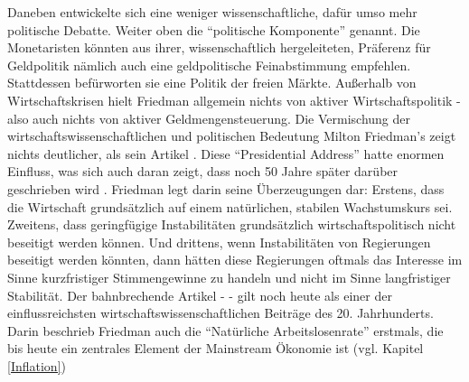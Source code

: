 Daneben entwickelte sich eine weniger wissenschaftliche, dafür umso mehr politische Debatte. Weiter oben die "`politische Komponente"' genannt. Die Monetaristen könnten aus ihrer, wissenschaftlich hergeleiteten, Präferenz für Geldpolitik nämlich auch eine geldpolitische Feinabstimmung empfehlen. Stattdessen befürworten sie eine Politik der freien Märkte. Außerhalb von Wirtschaftskrisen hielt Friedman allgemein nichts von aktiver Wirtschaftspolitik - also auch nichts von aktiver Geldmengensteuerung. Die Vermischung der wirtschaftswissenschaftlichen und politischen Bedeutung Milton Friedman's zeigt nichts deutlicher, als sein Artikel \textcite{Friedman1968}. Diese "`Presidential Address"' hatte enormen Einfluss, was sich auch daran zeigt, dass noch 50 Jahre später darüber geschrieben wird \parencite{Mankiw2018}. Friedman legt darin seine Überzeugungen dar: Erstens, dass die Wirtschaft grundsätzlich auf einem natürlichen, stabilen Wachstumskurs sei. Zweitens, dass geringfügige Instabilitäten grundsätzlich wirtschaftspolitisch nicht beseitigt werden können. Und drittens, wenn Instabilitäten von Regierungen beseitigt werden könnten, dann hätten diese Regierungen oftmals das Interesse im Sinne kurzfristiger Stimmengewinne zu handeln und nicht im Sinne langfristiger Stabilität. Der bahnbrechende Artikel - \textcite{Friedman1968} - gilt noch heute als einer der einflussreichsten wirtschaftswissenschaftlichen Beiträge des 20. Jahrhunderts. Darin beschrieb Friedman auch die "`Natürliche Arbeitslosenrate"' erstmals, die bis heute ein zentrales Element der Mainstream Ökonomie ist (vgl. Kapitel \ref{Inflation})

